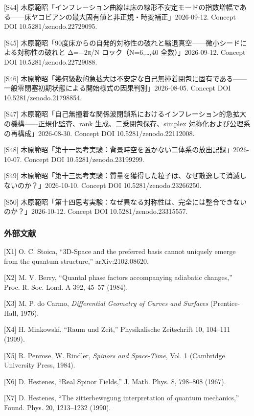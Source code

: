 \documentclass[
  a4paper,
]{ltjsarticle}
\begin{document}
{[}S44{]}
木原範昭「インフレーション曲線は床の線形不安定モードの指数増幅である------床ヤコビアンの最大固有値と非正規・時変補正」2026-09-12.
Concept DOI 10.5281/zenodo.22729095.

{[}S45{]}
木原範昭「90度床からの自発的対称性の破れと縮退真空------微小シードによる対称性の破れと
Δ=−2π/N ロック（N=6,\ldots,40 全数）」2026-09-12. Concept DOI
10.5281/zenodo.22729088.

{[}S46{]}
木原範昭「幾何級数的急拡大は不安定な自己無撞着閉包に固有である------一般零閉塞初期状態による開始様式の因果判別」2026-08-05.
Concept DOI 10.5281/zenodo.21798854.

{[}S47{]}
木原範昭「自己無撞着な関係波閉鎖系におけるインフレーション的急拡大の機構------正規化監査、rank
生成、二乗閉包保存、simplex 対称化および公理系の再構成」2026-08-30.
Concept DOI 10.5281/zenodo.22112008.

{[}S48{]}
木原範昭「第十一思考実験：背景時空を置かない二体系の放出記録」2026-10-07.
Concept DOI 10.5281/zenodo.23199299.

{[}S49{]}
木原範昭「第十三思考実験：質量を獲得した粒子は、なぜ散逸して消滅しないのか？」2026-10-10.
Concept DOI 10.5281/zenodo.23266250.

{[}S50{]}
木原範昭「第十四思考実験：なぜ異なる対称性は、完全には整合できないのか？」2026-10-12.
Concept DOI 10.5281/zenodo.23315557.

\subsubsection{外部文献}\label{ux5916ux90e8ux6587ux732e}

{[}X1{]} O. C. Stoica, ``3D-Space and the preferred basis cannot
uniquely emerge from the quantum structure,'' arXiv:2102.08620.

{[}X2{]} M. V. Berry, ``Quantal phase factors accompanying adiabatic
changes,'' Proc. R. Soc. Lond. A 392, 45--57 (1984).

{[}X3{]} M. P. do Carmo, \emph{Differential Geometry of Curves and
Surfaces} (Prentice-Hall, 1976).

{[}X4{]} H. Minkowski, ``Raum und Zeit,'' Physikalische Zeitschrift 10,
104--111 (1909).

{[}X5{]} R. Penrose, W. Rindler, \emph{Spinors and Space-Time}, Vol. 1
(Cambridge University Press, 1984).

{[}X6{]} D. Hestenes, ``Real Spinor Fields,'' J. Math. Phys. 8, 798--808
(1967).

{[}X7{]} D. Hestenes, ``The zitterbewegung interpretation of quantum
mechanics,'' Found. Phys. 20, 1213--1232 (1990).
\end{document}
